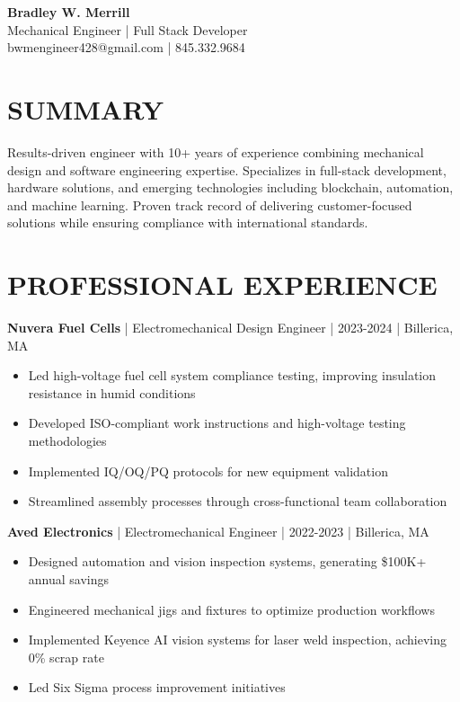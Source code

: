 \documentclass[11pt,letterpaper]{article}
\begin{document}
\begin{center}
{\Large\textbf{Bradley W. Merrill}}\\
\vspace{1mm}
Mechanical Engineer | Full Stack Developer\\
\vspace{1mm}
bwmengineer428@gmail.com | 845.332.9684
\end{center}

\section*{SUMMARY}
Results-driven engineer with 10+ years of experience combining mechanical design and software engineering expertise. Specializes in full-stack development, hardware solutions, and emerging technologies including blockchain, automation, and machine learning. Proven track record of delivering customer-focused solutions while ensuring compliance with international standards.

\section*{PROFESSIONAL EXPERIENCE}

\textbf{Nuvera Fuel Cells} | Electromechanical Design Engineer | 2023-2024 | Billerica, MA
\begin{itemize}[leftmargin=*]
\item Led high-voltage fuel cell system compliance testing, improving insulation resistance in humid conditions
\item Developed ISO-compliant work instructions and high-voltage testing methodologies
\item Implemented IQ/OQ/PQ protocols for new equipment validation
\item Streamlined assembly processes through cross-functional team collaboration
\end{itemize}

\textbf{Aved Electronics} | Electromechanical Engineer | 2022-2023 | Billerica, MA
\begin{itemize}[leftmargin=*]
\item Designed automation and vision inspection systems, generating \$100K+ annual savings
\item Engineered mechanical jigs and fixtures to optimize production workflows
\item Implemented Keyence AI vision systems for laser weld inspection, achieving 0\% scrap rate
\item Led Six Sigma process improvement initiatives
\end{itemize}
\end{document}
